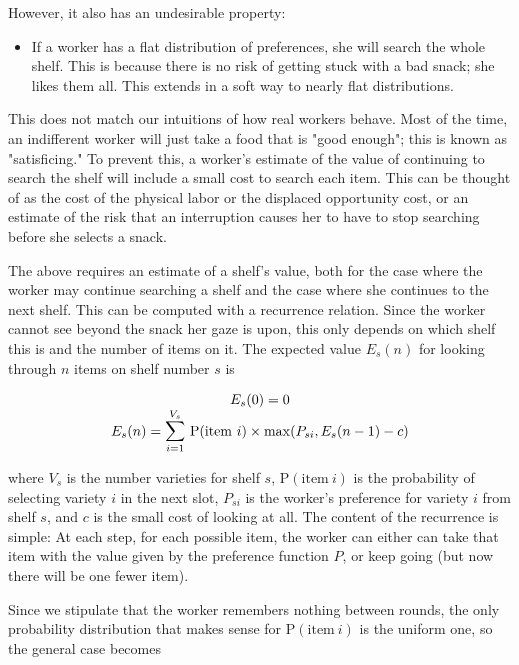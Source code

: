 \documentclass[twocolumn]{article}
\begin{document}
However, it also has an undesirable property:

\begin{itemize}
\item If a worker has a flat distribution of preferences, she will search the whole shelf. This is because there is no risk of getting stuck with a bad snack; she likes them all. This extends in a soft way to nearly flat distributions.
\end{itemize}

This does not match our intuitions of how real workers behave. Most of the time, an indifferent worker will just take a food that is "good enough"; this is known as "satisficing."\cite{simon1956rational} To prevent this, a worker's estimate of the value of continuing to search the shelf will include a small cost to search each item. This can be thought of as the cost of the physical labor or the displaced opportunity cost, or an estimate of the risk that an interruption causes her to have to stop searching before she selects a snack.

\medskip
The above requires an estimate of a shelf's value, both for the case where the worker may continue searching a shelf and the case where she continues to the next shelf. This can be computed with a recurrence relation. Since the worker cannot see beyond the snack her gaze is upon, this only depends on which shelf this is and the number of items on it. The expected value $E_s(n)$ for looking through $n$ items on shelf number $s$ is

$$
\begin{array}{c}
E_s(0) = 0 \\
E_s(n) = \mathlarger{\mathlarger{\sum}}_{i=1}^{V_s}\ \mathrm{P}(\mathrm{item}\ i) \times \mathrm{max}(P_{si}, E_s(n - 1) - c)
\end{array}
$$

where $V_s$ is the number varieties for shelf $s$, $\mathrm{P}(\mathrm{item}\ i)$ is the probability of selecting variety $i$ in the next slot, $P_{si}$ is the worker's preference for variety $i$ from shelf $s$, and $c$ is the small cost of looking at all. The content of the recurrence is simple: At each step, for each possible item, the worker can either can take that item with the value given by the preference function $P$, or keep going (but now there will be one fewer item).

Since we stipulate that the worker remembers nothing between rounds, the only probability distribution that makes sense for $\mathrm{P}(\mathrm{item}\ i)$ is the uniform one, so the general case becomes
\end{document}
